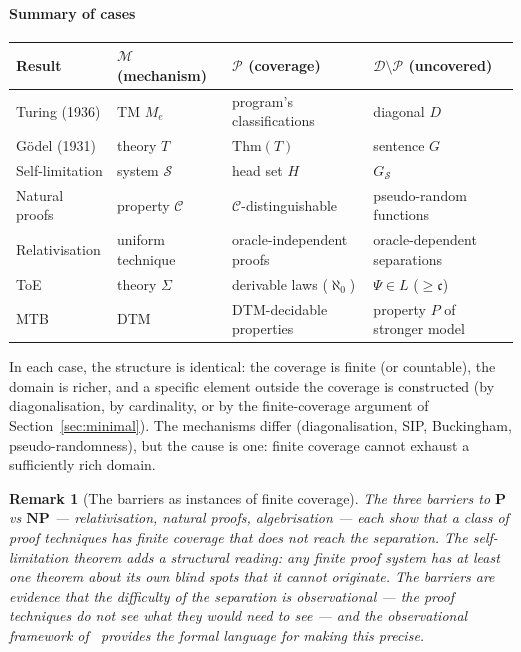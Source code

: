 \documentclass[11pt]{article}
\newtheorem{remark}[theorem]{Remark}
\begin{document}
\paragraph{Summary of cases}
\begin{center}
\renewcommand{\arraystretch}{1.3}
\begin{tabular}{p{3.2cm}p{3.5cm}p{3.5cm}p{3.5cm}}
\toprule
\textbf{Result} & \textbf{$\mathcal{M}$ (mechanism)}
  & \textbf{$\mathcal{P}$ (coverage)}
  & \textbf{$\mathcal{D} \setminus \mathcal{P}$ (uncovered)} \\
\midrule
Turing (1936) & TM $M_e$ & program's classifications & diagonal $D$ \\
G\"odel (1931) & theory $T$ & $\mathrm{Thm}(T)$ & sentence $G$ \\
Self-limitation & system $\mathcal{S}$ & head set $H$ & $G_{\mathcal{S}}$ \\
Natural proofs & property $\mathcal{C}$ & $\mathcal{C}$-distinguishable
  & pseudo-random functions \\
Relativisation & uniform technique & oracle-independent proofs
  & oracle-dependent separations \\
ToE~\cite{buono2026syntaxseedynamicsyntactic} & theory $\Sigma$ & derivable laws ($\aleph_0$)
  & $\Psi \in L$ ($\geq\mathfrak{c}$) \\
MTB~\cite{buono2026limitsuniformcertificationstandard} & DTM & DTM-decidable properties
  & property $P$ of stronger model \\
\bottomrule
\end{tabular}
\end{center}

\medskip
In each case, the structure is identical: the coverage is finite (or
countable), the domain is richer, and a specific element outside the
coverage is constructed (by diagonalisation, by cardinality, or by the
finite-coverage argument of Section~\ref{sec:minimal}). The mechanisms
differ (diagonalisation, SIP, Buckingham, pseudo-randomness), but the
cause is one: finite coverage cannot exhaust a sufficiently rich domain.

\begin{remark}[The barriers as instances of finite coverage]
The three barriers to $\mathbf{P}$ vs $\mathbf{NP}$ ---
relativisation, natural proofs, algebrisation --- each show that a class
of proof techniques has finite coverage that does not reach the
separation. The self-limitation theorem adds a structural reading: any
finite proof system has at least one theorem about its own blind spots
that it cannot originate. The barriers are evidence that the difficulty
of the separation is observational --- the proof techniques do not see
what they would need to see --- and the observational framework
of~\cite{buono2026framework,buono2026observer} provides the formal
language for making this precise.
\end{remark}
\end{document}
